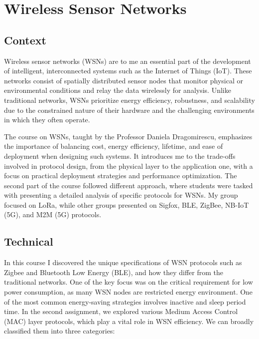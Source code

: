 \section{Wireless Sensor Networks}
\subsection{Context}
\indent \indent Wireless sensor networks (WSNs) are to me an essential part of the development of intelligent, interconnected systems such as the Internet of Things (IoT). These networks consist of spatially distributed sensor nodes that monitor physical or environmental conditions and relay the data wirelessly for analysis. Unlike traditional networks, WSNs prioritize energy efficiency, robustness, and scalability due to the constrained nature of their hardware and the challenging environments in which they often operate.

The course on WSNs, taught by the Professor Daniela Dragomirescu, emphasizes the importance of balancing cost, energy efficiency, lifetime, and ease of deployment when designing such systems. It introduces me to the trade-offs involved in protocol design, from the physical layer to the application one, with a focus on practical deployment strategies and performance optimization.
The second part of the course followed different approach, where students were tasked with presenting a detailed analysis of specific protocols for WSNs. My group focused on LoRa, while other groups presented on Sigfox, BLE, ZigBee, NB-IoT (5G), and M2M (5G) protocols.

\subsection{Technical}  

\indent \indent In this course I discovered the unique specifications of WSN protocols such as Zigbee and Bluetooth Low Energy (BLE), and how they differ from the traditional networks.  One of the key focus was on the critical requirement for low power consumption, as many WSN nodes are restricted energy environment. One of the most common energy-saving strategies involves inactive and sleep period time.
\smallskip
In the second assignment, we explored various Medium Access Control (MAC) layer protocols, which play a vital role in WSN efficiency. We can  broadly classified them into three categories:

